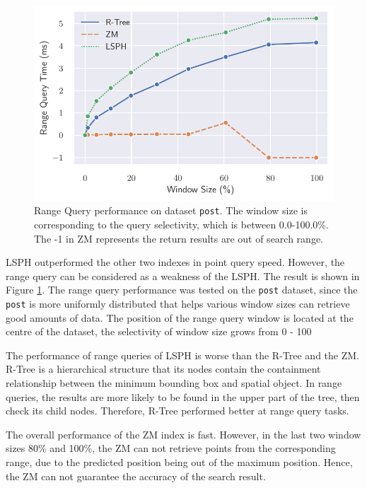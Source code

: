 \begin{figure}
    \centering
    \includegraphics[scale=0.7]{Figures/range_result.pdf}\hfill
    \caption{Range Query performance on dataset \texttt{post}. The window size is corresponding to the query selectivity, which is between 0.0-100.0\%. The -1 in ZM represents the return results are out of search range.}\label{fig:range_result}
\end{figure}

LSPH outperformed the other two indexes in point query speed. However, the range query can be considered as a weakness of the LSPH. The result is shown in Figure \ref{fig:range_result}. The range query performance was tested on the \texttt{post} dataset, since the \texttt{post} is more uniformly distributed that helps various window sizes can retrieve good amounts of data. The position of the range query window is located at the centre of the dataset, the selectivity of window size grows from 0 - 100 %

The performance of range queries of LSPH is worse than the R-Tree and the ZM. R-Tree is a hierarchical structure that its nodes contain the containment relationship between the minimum bounding box and spatial object. In range queries, the results are more likely to be found in the upper part of the tree, then check its child nodes. Therefore, R-Tree performed better at range query tasks. 

The overall performance of the ZM index is fast. However, in the last two window sizes 80\% and 100\%, the ZM can not retrieve points from the corresponding range, due to the predicted position being out of the maximum position. Hence, the ZM can not guarantee the accuracy of the search result. 

